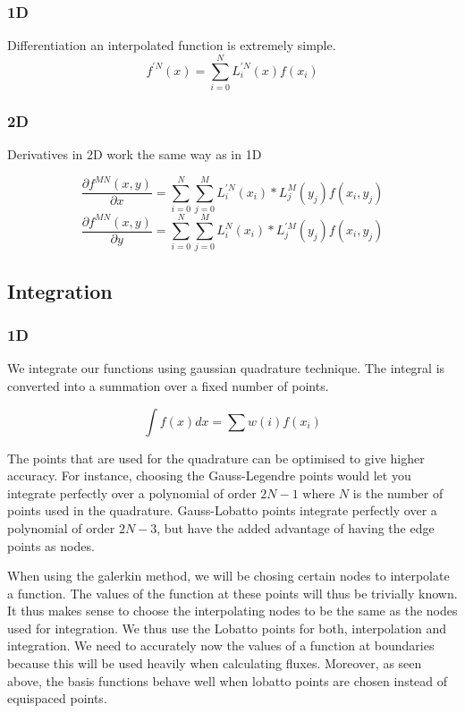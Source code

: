\documentclass[11pt]{article}
\begin{document}
\subsubsection{1D}\label{d}

Differentiation an interpolated function is extremely simple.
\[f^{'N}(x) = \sum_{i=0}^{N}L_i^{'N}(x)f(x_i)\]

\subsubsection{2D}\label{d-1}

Derivatives in 2D work the same way as in 1D

\[\frac{\partial f^{MN}(x,y)}{\partial x} = \sum_{i=0}^{N} \sum_{j=0}^{M} L_i^{'N}(x_i) * L_j^{M}(y_j) f(x_i,y_j)\]
\[\frac{\partial f^{MN}(x,y)}{\partial y} = \sum_{i=0}^{N} \sum_{j=0}^{M} L_i^{N}(x_i) * L_j^{'M}(y_j) f(x_i,y_j)\]

    \subsection{Integration}\label{integration}

\subsubsection{1D}\label{d}

We integrate our functions using gaussian quadrature technique. The
integral is converted into a summation over a fixed number of points.

\[\int f(x) dx = \sum w(i)f(x_i)\]

The points that are used for the quadrature can be optimised to give
higher accuracy. For instance, choosing the Gauss-Legendre points would
let you integrate perfectly over a polynomial of order \(2N-1\) where
\(N\) is the number of points used in the quadrature. Gauss-Lobatto
points integrate perfectly over a polynomial of order \(2N-3\), but have
the added advantage of having the edge points as nodes.

When using the galerkin method, we will be chosing certain nodes to
interpolate a function. The values of the function at these points will
thus be trivially known. It thus makes sense to choose the interpolating
nodes to be the same as the nodes used for integration. We thus use the
Lobatto points for both, interpolation and integration. We need to
accurately now the values of a function at boundaries because this will
be used heavily when calculating fluxes. Moreover, as seen above, the
basis functions behave well when lobatto points are chosen instead of
equispaced points.
\end{document}
